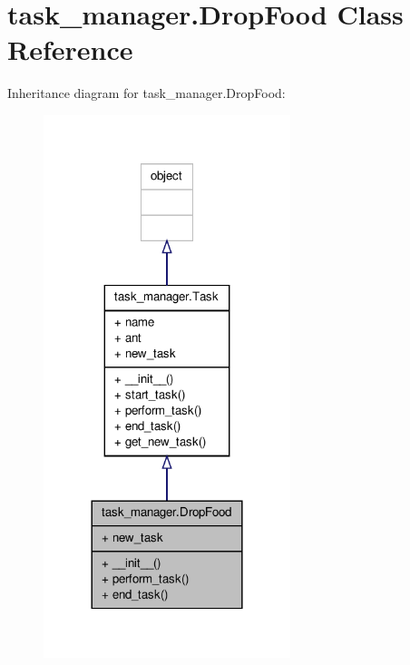 \hypertarget{classtask__manager_1_1DropFood}{\section{task\+\_\+manager.\+Drop\+Food Class Reference}
\label{classtask__manager_1_1DropFood}
}


Inheritance diagram for task\+\_\+manager.\+Drop\+Food\+:\nopagebreak
\begin{figure}[H]
\begin{center}
\leavevmode
\includegraphics[width=204pt]{classtask__manager_1_1DropFood__inherit__graph}
\end{center}
\end{figure}


